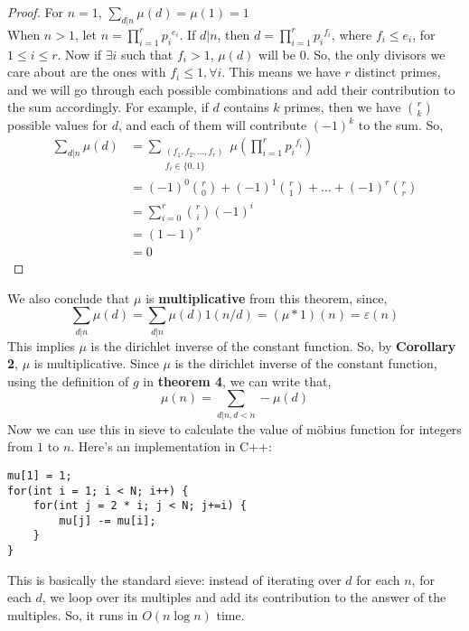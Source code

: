 \documentclass[11pt]{article}
\begin{document}
\begin{proof}
  For $n = 1$, $\sum_{d|n} \mu(d) = \mu(1) = 1$ \\
  When $n > 1$, let $n = \prod_{i = 1}^{r} {p_i}^{e_i}$. If $d|n$, then $d = \prod_{i = 1}^{r} {p_i}^{f_i}$, where $f_i \leq e_i$, for $1 \leq i \leq r$. Now if $\exists i$ such that $f_i > 1$, $\mu(d)$ will be $0$. So, the only divisors we care about are the ones with $f_i \leq 1, \forall i$. This means we have $r$ distinct primes, and we will go through each possible combinations and add their contribution to the sum accordingly. For example, if $d$ contains $k$ primes, then we have $\binom{r}{k}$ possible values for $d$, and each of them will contribute $(-1)^k$ to the sum. So, 
  \begin{align*}
    \sum \limits_{d|n} \mu(d) &= \sum \limits_{\substack{(f_1, f_2, \dots, f_r) \\ f_i \in \{0, 1\}}} \mu(\prod_{i=1}^{r} {p_i}^{f_i}) \\
                              &= (-1)^0 \binom{r}{0} + (-1)^1 \binom{r}{1} + \dots + (-1)^r \binom{r}{r}\\
                              &= \sum \limits_{i = 0}^{r} \binom{r}{i} (-1)^i \\
                              &= (1 - 1)^r \\
                              &= 0
  \end{align*}
\end{proof}
We also conclude that $\mu$ is \textbf{multiplicative} from this theorem, since,
$$\sum_{d|n} \mu(d) = \sum_{d|n} \mu(d) 1(n/d) = (\mu * 1)(n) = \varepsilon(n)$$
This implies $\mu$ is the dirichlet inverse of the constant function. So, by \textbf{Corollary 2}, $\mu$ is multiplicative. Since $\mu$ is the dirichlet inverse of the constant function, using the definition of $g$ in \textbf{theorem 4}, we can write that,
$$\mu(n) = \sum_{d|n, d < n} -\mu(d)$$
Now we can use this in sieve to calculate the value of m\"{o}bius function for integers from $1$ to $n$. Here's an implementation in C++:
\begin{verbatim}
mu[1] = 1;
for(int i = 1; i < N; i++) {
    for(int j = 2 * i; j < N; j+=i) {
        mu[j] -= mu[i];
    }
}
\end{verbatim}
This is basically the standard sieve: instead of iterating over $d$ for each $n$, for each $d$, we loop over its multiples and add its contribution to the answer of the multiples. So, it runs in $O(n \log n)$ time.
\end{document}
